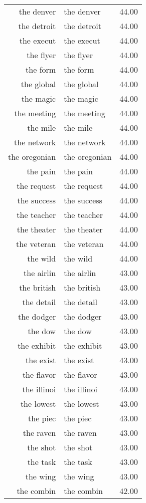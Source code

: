 \begin{table}[ht]
\begin{tabular}{rlr}
  the denver & the denver & 44.00 \\ 
  the detroit & the detroit & 44.00 \\ 
  the execut & the execut & 44.00 \\ 
  the flyer & the flyer & 44.00 \\ 
  the form & the form & 44.00 \\ 
  the global & the global & 44.00 \\ 
  the magic & the magic & 44.00 \\ 
  the meeting & the meeting & 44.00 \\ 
  the mile & the mile & 44.00 \\ 
  the network & the network & 44.00 \\ 
  the oregonian & the oregonian & 44.00 \\ 
  the pain & the pain & 44.00 \\ 
  the request & the request & 44.00 \\ 
  the success & the success & 44.00 \\ 
  the teacher & the teacher & 44.00 \\ 
  the theater & the theater & 44.00 \\ 
  the veteran & the veteran & 44.00 \\ 
  the wild & the wild & 44.00 \\ 
  the airlin & the airlin & 43.00 \\ 
  the british & the british & 43.00 \\ 
  the detail & the detail & 43.00 \\ 
  the dodger & the dodger & 43.00 \\ 
  the dow & the dow & 43.00 \\ 
  the exhibit & the exhibit & 43.00 \\ 
  the exist & the exist & 43.00 \\ 
  the flavor & the flavor & 43.00 \\ 
  the illinoi & the illinoi & 43.00 \\ 
  the lowest & the lowest & 43.00 \\ 
  the piec & the piec & 43.00 \\ 
  the raven & the raven & 43.00 \\ 
  the shot & the shot & 43.00 \\ 
  the task & the task & 43.00 \\ 
  the wing & the wing & 43.00 \\ 
  the combin & the combin & 42.00 \\ 

\end{tabular}
\end{table}
